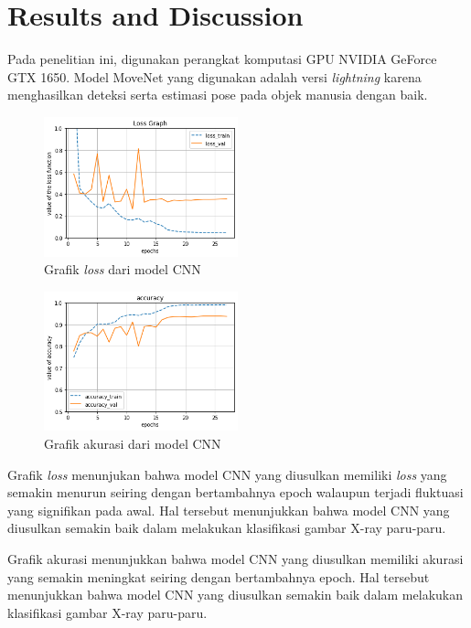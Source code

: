 \documentclass[conference]{IEEEtran}
\begin{document}
\section{Results and Discussion}
Pada penelitian ini, digunakan perangkat komputasi GPU NVIDIA GeForce GTX 1650. Model MoveNet yang digunakan adalah versi \textit{lightning} karena menghasilkan deteksi serta estimasi pose pada objek manusia dengan baik.

\begin{figure}[htbp]
    \centerline{\includegraphics[width=0.5\textwidth]{figures/loss.png}}
    \caption{Grafik \textit{loss} dari model CNN}
\end{figure}

\begin{figure}[htbp]
    \centerline{\includegraphics[width=0.5\textwidth]{figures/accuracy.png}}
    \caption{Grafik akurasi dari model CNN}
\end{figure}

Grafik \textit{loss} menunjukan bahwa model CNN yang diusulkan memiliki \textit{loss} yang semakin menurun seiring dengan bertambahnya epoch walaupun terjadi fluktuasi yang signifikan pada awal. Hal tersebut menunjukkan bahwa model CNN yang diusulkan semakin baik dalam melakukan klasifikasi gambar X-ray paru-paru.

Grafik akurasi menunjukkan bahwa model CNN yang diusulkan memiliki akurasi yang semakin meningkat seiring dengan bertambahnya epoch. Hal tersebut menunjukkan bahwa model CNN yang diusulkan semakin baik dalam melakukan klasifikasi gambar X-ray paru-paru.
\end{document}
